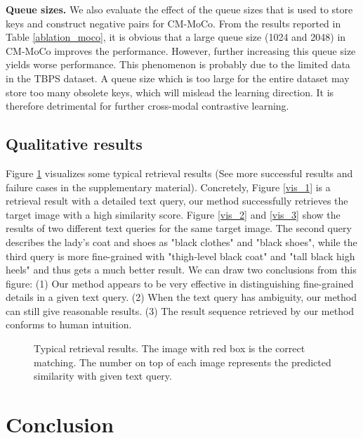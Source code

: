 \documentclass{bmvc2k}
\newcommand{\revision}[1]{#1}
\newcommand{\statement}[1]{\noindent\textbf{#1}}
\begin{document}
\statement{Queue sizes.} We also evaluate the effect of the queue sizes that is used to store keys and construct negative pairs for CM-MoCo. 
From the results reported in Table \ref{ablation_moco}, it is obvious that a large queue size (1024 and 2048) in CM-MoCo improves the performance. 
However, further increasing this queue size yields worse performance. 
This phenomenon is probably due to the limited data in the TBPS dataset.
A queue size which is too large for the entire dataset may store too many obsolete keys, which will mislead the learning direction. 
It is therefore detrimental for further cross-modal contrastive learning.

\vspace*{-3mm}
\subsection{Qualitative results} Figure \ref{vis_result} visualizes some typical retrieval results (See more successful results and failure cases in the supplementary material). 
Concretely, Figure \ref{vis_1} is a retrieval result with a detailed text query, our method successfully retrieves the target image with a high similarity score.
Figure \ref{vis_2} and \ref{vis_3} show the results of two different text queries for the same target image.
The second query describes the lady's coat and shoes as "black clothes" and "black shoes", while the third query is more fine-grained with "thigh-level black coat" and "tall black high heels" and thus gets a much better result. We can draw two conclusions from this figure:
(1) Our method appears to be very effective in distinguishing fine-grained details in a given text query.
(2) When the text query has ambiguity, our method can still give reasonable results.
\revision{(3) The result sequence retrieved by our method conforms to human intuition.}
\begin{figure}[t]
\centering
{}
\caption{Typical retrieval results. The image with red box is the correct matching. The number on top of each image represents the predicted similarity with given text query.}
\label{vis_result}
\end{figure}  \section{Conclusion}
\end{document}
